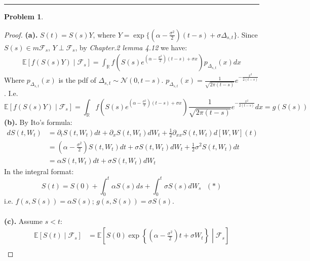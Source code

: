 \documentclass[a4paper, 10pt]{article}
\theoremstyle{definition}
\newtheorem{problem}{Problem}
\theoremstyle{hSol}
\begin{document}
\noindent\rule{16cm}{0.4pt}
\begin{problem}
\end{problem}
\begin{proof} \textbf{(a).} $S(t) = S(s) Y$, where $Y=\exp\{(\alpha - \frac{\sigma^2}{2})(t-s) + \sigma \Delta_{s,t}\}$. Since $S(s)\in m \mathcal{F}_s$, $Y\perp \mathcal{F}_s$, by \textit{Chapter.2 lemma 4.12} we have:
\begin{equation}
	\begin{split}
		\mathbb{E}\left[f(S(s)Y)\middle|\mathcal{F}_s\right] = \int_{\mathbb{R}} f(S(s)e^{(\alpha - \frac{\sigma^2}{2})(t-s) + \sigma x}) p_{\Delta_{s,t}}(x)dx
	\end{split}
\end{equation}
Where $p_{\Delta_{s,t}}(x)$ is the pdf of $\Delta_{s,t} \sim \mathcal{N}(0, t-s)$. $p_{\Delta_{s,t}}(x) = \frac{1}{\sqrt{2\pi(t-s)}}e^{-\frac{x^2}{2(t-s)}}$. I.e.
\begin{equation}
	\mathbb{E}\left[f(S(s)Y)\middle|\mathcal{F}_s\right] = \int_{\mathbb{R}} f(S(s)e^{(\alpha - \frac{\sigma^2}{2})(t-s) + \sigma x}) \frac{1}{\sqrt{2\pi(t-s)}}e^{-\frac{x^2}{2(t-s)}}dx = g(S(s))
\end{equation}
\textbf{(b).} By Ito's formula:
\begin{equation}
	\begin{split}
		dS(t,W_t) &= \partial_t S(t,W_t) dt +  \partial_x S(t,W_t) dW_t + \frac{1}{2} \partial_{xx} S(t,W_t) d[W, W](t)  \\
		&= (\alpha - \tfrac{\sigma^2}{2})S(t,W_t) dt + \sigma S(t,W_t) dW_t + \frac{1}{2}\sigma^2  S(t,W_t)dt \\
		&= \alpha S(t,W_t) dt + \sigma S(t,W_t) dW_t
	\end{split}
\end{equation}
In the integral format:
\begin{equation}
	S(t) = S(0) + \int_0^t \alpha S(s) ds + \int_0^t \sigma S(s) dW_s~~~(*)
\end{equation}
i.e. $f(s,S(s)) = \alpha S(s)$; $g(s, S(s))=\sigma S(s)$.\\
~\\
\textbf{(c).} Assume $s<t$:
\begin{equation}
	\begin{split}
		\mathbb{E}\left[S(t)\middle|\mathcal{F}_s\right] &= \mathbb{E}\left[S(0)\exp\left\{\left(\alpha -\frac{\sigma^2}{2}\right)t + \sigma W_t\right\} \middle|\mathcal{F}_s\right]\\

\end{split}
\end{equation}
\end{proof}
\end{document}
